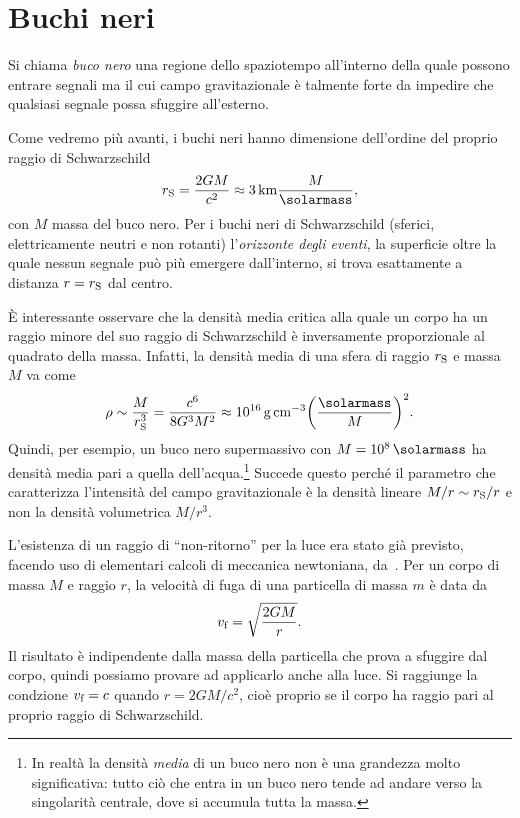 \chapter{Buchi neri}
\label{sec:buchi-neri}

\label{definizione-buco-nero} Si chiama \emph{buco nero} una regione dello
spaziotempo all'interno della quale possono entrare segnali ma il cui campo
gravitazionale è talmente forte da impedire che qualsiasi segnale possa sfuggire
all'esterno.

Come vedremo più avanti, i buchi neri hanno dimensione dell'ordine del proprio
raggio di Schwarzschild
\begin{equation}
  r_{\textup{S}} = \frac{2GM}{c^{2}} \approx
  \SI{3}{\kilo\metre} \frac{M}{\si{\solarmass}},
\end{equation}
con \(M\) massa del buco nero.  Per i buchi neri di Schwarzschild (sferici,
elettricamente neutri e non rotanti) l'\emph{orizzonte degli eventi}, la
superficie oltre la quale nessun segnale può più emergere dall'interno, si trova
esattamente a distanza \(r = r_{\textup{S}}\) dal centro.

È interessante osservare che la densità media critica alla quale un corpo ha un
raggio minore del suo raggio di Schwarzschild è inversamente proporzionale al
quadrato della massa.  Infatti, la densità media di una sfera di raggio
\(r_{\textup{S}}\) e massa \(M\) va come
\begin{equation}
  \rho \sim \frac{M}{r_{\textup{S}}^{3}} = \frac{c^{6}}{8G^{3}M^{2}} \approx
  \SI{e16}{\gram\per\centi\metre\cubed}
  \biggl(\frac{\si{\solarmass}}{M}\biggr)^{2}.
\end{equation}
Quindi, per esempio, un buco nero supermassivo con \(M = \SI{e8}{\solarmass}\)
ha densità media pari a quella dell'acqua.\footnote{In realtà la densità
  \emph{media} di un buco nero non è una grandezza molto significativa: tutto
  ciò che entra in un buco nero tende ad andare verso la singolarità centrale,
  dove si accumula tutta la massa.} Succede questo perché il parametro che
caratterizza l'intensità del campo gravitazionale è la densità lineare \(M/r
\sim r_{\textup{S}}/r\) e non la densità volumetrica \(M/r^{3}\).

L'esistenza di un raggio di ``non-ritorno'' per la luce era stato già previsto,
facendo uso di elementari calcoli di meccanica newtoniana,
da~\textcites{1784RSPT...74...35M}{laplace:exposition}.  Per un corpo di massa
\(M\) e raggio \(r\), la velocità di fuga di una particella di massa \(m\) è
data da
\begin{equation}
  v_{\textup{f}} = \sqrt{\frac{2GM}{r}}.
\end{equation}
Il risultato è indipendente dalla massa della particella che prova a sfuggire
dal corpo, quindi possiamo provare ad applicarlo anche alla luce.  Si raggiunge
la condzione \(v_{\textup{f}} = c\) quando \(r = 2GM/c^{2}\), cioè proprio se il
corpo ha raggio pari al proprio raggio di Schwarzschild.

